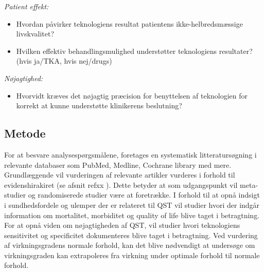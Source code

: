 \textit{Patient effekt:}
\begin{itemize}
	\item Hvordan påvirker teknologiens resultat patientens ikke-helbredsmæssige livskvalitet? %
	\item Hvilken effektiv behandlingsmulighed understøtter teknologiens resultater? (hvis ja/TKA, hvis nej/drugs) %
\end{itemize}
\textit{Nøjagtighed:}
\begin{itemize}
\item Hvorvidt kræves det nøjagtig præcision for benyttelsen af teknologien for korrekt at kunne understøtte klinikerens beslutning? %
\end{itemize}

\subsection{Metode \citep{HTAcore}}
For at besvare analysespørgsmålene, foretages en systematisk litteratursøgning i relevante databaser som PubMed, Medline, Cochrane library med mere. Grundlæggende vil vurderingen af relevante artikler vurderes i forhold til evidenshirakiret (se afsnit ref{xx} ). Dette betyder at som udgangspunkt vil meta-studier og randomiserede studier være at foretrække. I forhold til at opnå indsigt i sundhedsfordele og ulemper der er relateret til QST vil studier hvori der indgår information om mortalitet, morbiditet og quality of life blive taget i betragtning. For at opnå viden om nøjagtigheden af QST, vil studier hvori teknologiens sensitivitet og specificitet dokumenteres blive taget i betragtning. Ved vurdering af virkningsgradens normale forhold, kan det blive nødvendigt at undersøge om virkningsgraden kan extrapoleres fra virkning under optimale forhold til normale forhold.
